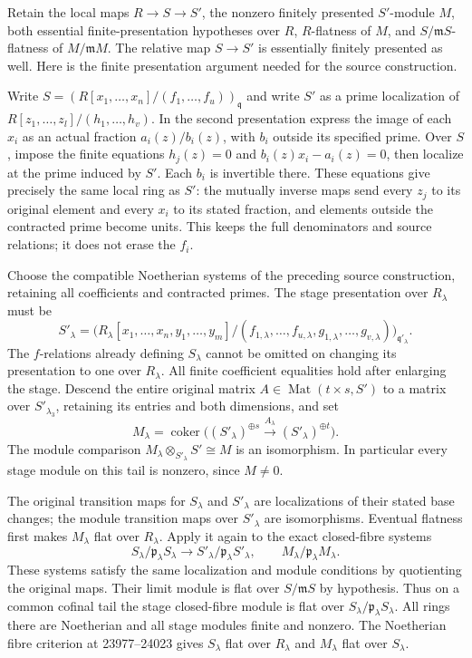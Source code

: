 Retain the local maps \(R\to S\to S'\), the nonzero finitely presented \(S'\)-module \(M\), both essential finite-presentation hypotheses over \(R\), \(R\)-flatness of \(M\), and \(S/\mathfrak mS\)-flatness of \(M/\mathfrak mM\). The relative map \(S\to S'\) is essentially finitely presented as well. Here is the finite presentation argument needed for the source construction.

Write \(S=(R[x_1,\ldots,x_n]/(f_1,\ldots,f_u))_{\mathfrak q}\) and write \(S'\) as a prime localization of \(R[z_1,\ldots,z_l]/(h_1,\ldots,h_v)\). In the second presentation express the image of each \(x_i\) as an actual fraction \(a_i(z)/b_i(z)\), with \(b_i\) outside its specified prime. Over \(S\), impose the finite equations \(h_j(z)=0\) and \(b_i(z)x_i-a_i(z)=0\), then localize at the prime induced by \(S'\). Each \(b_i\) is invertible there. These equations give precisely the same local ring as \(S'\): the mutually inverse maps send every \(z_j\) to its original element and every \(x_i\) to its stated fraction, and elements outside the contracted prime become units. This keeps the full denominators and source relations; it does not erase the \(f_i\).

Choose the compatible Noetherian systems of the preceding source construction, retaining all coefficients and contracted primes. The stage presentation over \(R_\lambda\) must be \[
S'_\lambda=
\bigl(R_\lambda[x_1,\ldots,x_n,y_1,\ldots,y_m]/
 (f_{1,\lambda},\ldots,f_{u,\lambda},
  g_{1,\lambda},\ldots,g_{v,\lambda})\bigr)_{\mathfrak q'_\lambda}.
\] The \(f\)-relations already defining \(S_\lambda\) cannot be omitted on changing its presentation to one over \(R_\lambda\). All finite coefficient equalities hold after enlarging the stage. Descend the entire original matrix \(A\in\operatorname{Mat}(t\times s,S')\) to a matrix over \(S'_{\lambda_3}\), retaining its entries and both dimensions, and set \[
M_\lambda=\operatorname{coker}\bigl((S'_\lambda)^{\oplus s}
 \xrightarrow{A_\lambda}(S'_\lambda)^{\oplus t}\bigr).
\] The module comparison \(M_\lambda\otimes_{S'_\lambda}S'\cong M\) is an isomorphism. In particular every stage module on this tail is nonzero, since \(M\ne0\).

The original transition maps for \(S_\lambda\) and \(S'_\lambda\) are localizations of their stated base changes; the module transition maps over \(S'_\lambda\) are isomorphisms. Eventual flatness first makes \(M_\lambda\) flat over \(R_\lambda\). Apply it again to the exact closed-fibre systems \[
S_\lambda/\mathfrak p_\lambda S_\lambda
\longrightarrow S'_\lambda/\mathfrak p_\lambda S'_\lambda,\qquad
M_\lambda/\mathfrak p_\lambda M_\lambda.
\] These systems satisfy the same localization and module conditions by quotienting the original maps. Their limit module is flat over \(S/\mathfrak mS\) by hypothesis. Thus on a common cofinal tail the stage closed-fibre module is flat over \(S_\lambda/\mathfrak p_\lambda S_\lambda\). All rings there are Noetherian and all stage modules finite and nonzero. The Noetherian fibre criterion at 23977--24023 gives \(S_\lambda\) flat over \(R_\lambda\) and \(M_\lambda\) flat over \(S_\lambda\).


